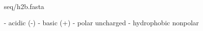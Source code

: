 \documentclass[12pt,onecolumn]{scrartcl}
\begin{document}
\begin{landscape}
\begin{texshade}{seq/h2b.fasta}
\featurerule{1mm}



\end{texshade}


 - acidic (-)
 - basic (+)
 - polar uncharged
 - hydrophobic nonpolar




\end{landscape}

%

%

\end{document}
